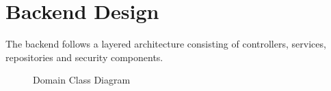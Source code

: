 \section{Backend Design}

The backend follows a layered architecture consisting of controllers, services,
repositories and security components.

\begin{figure}[H]
  \centering
  \caption{Domain Class Diagram}
\end{figure}
